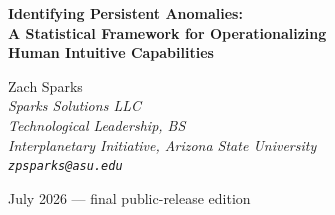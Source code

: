 \documentclass[11pt,letterpaper]{article}
\begin{document}
\begin{center}
{\LARGE\bfseries Identifying Persistent Anomalies:\\[4pt]
A Statistical Framework for Operationalizing\\[4pt]
Human Intuitive Capabilities}

\vspace{16pt}
{\large Zach Sparks}\\[4pt]
{\small\itshape Sparks Solutions LLC\\
Technological Leadership, BS\\
Interplanetary Initiative, Arizona State University\\
\texttt{zpsparks@asu.edu}}

\vspace{8pt}
{\small July 2026 --- final public-release edition}
\end{center}

\vspace{12pt}

\end{document}
